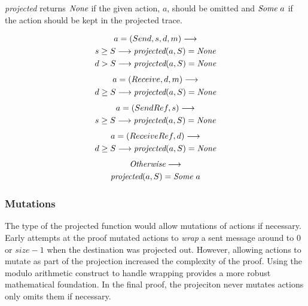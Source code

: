 \documentclass[runningheads]{llncs}
\begin{document}
\emph{projected} returns $\emph{None}$ if the given action, $a$,  should be omitted and $\emph{Some}\ a$ if the action should be kept in the projected trace.

\begin{definition}[projected]
\begin{multline*}
a = (Send, s, d, m) \longrightarrow \\
s \ge S \longrightarrow \emph{projected}(a, S) = \emph{None} \\
d > S \longrightarrow \emph{projected}(a, S) = \emph{None} \\
\end{multline*}
\begin{multline*}
a = (Receive, d, m) \longrightarrow \\
d \ge S \longrightarrow \emph{projected}(a, S) = \emph{None} \\
\end{multline*}
\begin{multline*}
a = (SendRef, s) \longrightarrow \\
s \ge S \longrightarrow \emph{projected}(a, S) = \emph{None} \\
\end{multline*}
\begin{multline*}
a = (ReceiveRef, d) \longrightarrow \\
d \ge S \longrightarrow \emph{projected}(a, S) = \emph{None} \\
\end{multline*}
\begin{multline*}
\emph{Otherwise} \longrightarrow \\
\emph{projected}(a, S) = \emph{Some}\ a\\
\end{multline*}
\end{definition}


\subsubsection{Mutations}
The type of the projected function would allow mutations of actions if necessary. Early attempts at the proof mutated actions to \emph{wrap} a sent message around to $0$ or $size-1$ when the destination was projected out. However, allowing actions to mutate as part of the projection increased the complexity of the proof. Using the modulo arithmetic construct to handle wrapping provides a more robust mathematical foundation. In the final proof, the projeciton never mutates actions only omits them if necessary. 
\end{document}
